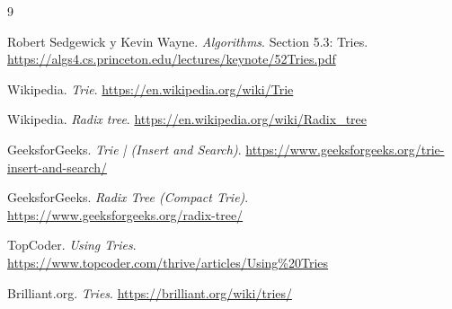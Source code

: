 \documentclass[11pt,a4paper]{article}
\begin{document}
\begin{thebibliography}{9}

Robert Sedgewick y Kevin Wayne. \textit{Algorithms}. Section 5.3: Tries. 
\url{https://algs4.cs.princeton.edu/lectures/keynote/52Tries.pdf}

Wikipedia. \textit{Trie}. 
\url{https://en.wikipedia.org/wiki/Trie}

Wikipedia. \textit{Radix tree}. 
\url{https://en.wikipedia.org/wiki/Radix_tree}

GeeksforGeeks. \textit{Trie | (Insert and Search)}. 
\url{https://www.geeksforgeeks.org/trie-insert-and-search/}

GeeksforGeeks. \textit{Radix Tree (Compact Trie)}. 
\url{https://www.geeksforgeeks.org/radix-tree/}

TopCoder. \textit{Using Tries}. 
\url{https://www.topcoder.com/thrive/articles/Using%20Tries}

Brilliant.org. \textit{Tries}. 
\url{https://brilliant.org/wiki/tries/}

\end{thebibliography}
\end{document}
